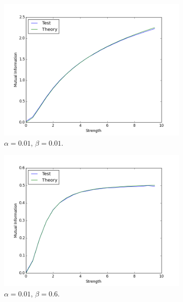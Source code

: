 \documentclass{article}
\begin{document}
		\begin{figure}[h]
			\centering
			\begin{subfigure}[b]{0.3\textwidth}
				\includegraphics[width = \textwidth]{gauss/linear_001_001_150.png}
				\caption{$\alpha = 0.01$, $\beta = 0.01$.}
			\end{subfigure}
			\begin{subfigure}[b]{0.3\textwidth}
				\includegraphics[width = \textwidth]{gauss/linear_001_06_50.png}
				\caption{$\alpha = 0.01$, $\beta = 0.6$.}
			\end{subfigure}
			\begin{subfigure}[b]{0.3\textwidth}

\end{subfigure}
\end{figure}
\end{document}
